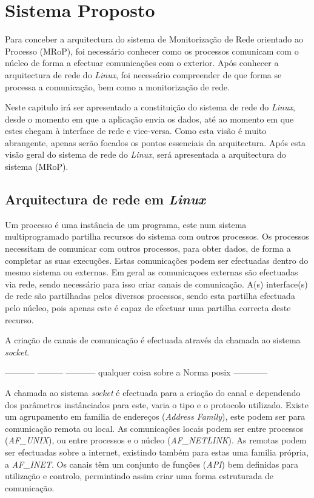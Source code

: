 \chapter{Sistema Proposto}
\label{cap:Estrutura}

Para conceber a arquitectura do sistema de Monitorização de Rede orientado ao Processo (MRoP), foi necessário conhecer como os processos comunicam com o núcleo de forma a efectuar comunicações com o exterior.
Após conhecer a arquitectura de rede do \textit{Linux}, foi necessário compreender de que forma se processa a comunicação, bem como a monitorização de rede.

Neste capitulo irá ser apresentado a constituição do sistema de rede do \textit{Linux}, desde o momento em que a aplicação envia os dados, até ao momento em que estes chegam à interface de rede e vice-versa.
Como esta visão é muito abrangente, apenas serão focados os pontos essenciais da arquitectura.
Após esta visão geral do sistema de rede do \textit{Linux}, será apresentada a arquitectura do sistema (MRoP).


\section{Arquitectura de rede em \textit{Linux}}
\label{sub:network}

Um processo é uma instância de um programa, este num sistema multiprogramado partilha recursos do sistema com outros processos.
Os processos necessitam de comunicar com outros processos, para obter dados, de forma a completar as suas execuções.
Estas comunicações podem ser efectuadas dentro do mesmo sistema ou externas.
Em geral as comunicaçoes externas são efectuadas via rede, sendo necessário para isso criar canais de comunicação.
A(s) interface(s) de rede são partilhadas pelos diversos processos, sendo esta partilha efectuada pelo núcleo, pois apenas este é capaz de efectuar uma partilha correcta deste recurso.

A criação de canais de comunicação é efectuada através da chamada ao sistema \textit{socket}.

----------- --------- ----------- qualquer coisa sobre a Norma posix ------------

A chamada ao sistema \textit{socket} é efectuada para a criação do canal e dependendo dos parâmetros instânciados para este, varia o tipo e o protocolo utilizado.
Existe um agrupamento em familia de endereços (\textit{Address Family}), este podem ser para comunicação remota ou local.
As comunicações locais podem ser entre processos (\textit{AF\_UNIX}), ou entre processos e o núcleo (\textit{AF\_NETLINK}).
As remotas podem ser efectuadas sobre a internet, existindo também para estas uma familia própria, a \textit{AF\_INET}.
Os canais têm um conjunto de funções (\textit{API}) bem definidas para utilização e controlo, permintindo assim criar uma forma estruturada de comunicação.

